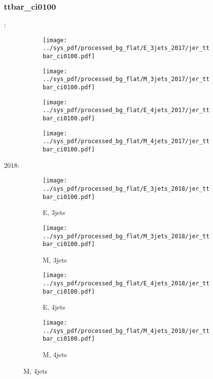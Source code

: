 \documentclass{beamer}
\begin{document}
\begin{frame}
\frametitle{ttbar_ci0100}
\fontsize{5}{1}:
\begin{figure}
\centering
\begin{subfigure}[b]{0.24\textwidth}
\texttt{[image: ../sys\_pdf/processed\_bg\_flat/E\_3jets\_2017/jer\_ttbar\_ci0100.pdf]}
\end{subfigure}
\begin{subfigure}[b]{0.24\textwidth}
\texttt{[image: ../sys\_pdf/processed\_bg\_flat/M\_3jets\_2017/jer\_ttbar\_ci0100.pdf]}
\end{subfigure}
\begin{subfigure}[b]{0.24\textwidth}
\texttt{[image: ../sys\_pdf/processed\_bg\_flat/E\_4jets\_2017/jer\_ttbar\_ci0100.pdf]}
\end{subfigure}
\begin{subfigure}[b]{0.24\textwidth}
\texttt{[image: ../sys\_pdf/processed\_bg\_flat/M\_4jets\_2017/jer\_ttbar\_ci0100.pdf]}
\end{subfigure}
\end{figure}
2018:
\begin{figure}
\centering
\begin{subfigure}[b]{0.24\textwidth}
\texttt{[image: ../sys\_pdf/processed\_bg\_flat/E\_3jets\_2018/jer\_ttbar\_ci0100.pdf]}
\captionsetup{font=tiny}
\caption{E, 3jets}
\end{subfigure}
\begin{subfigure}[b]{0.24\textwidth}
\texttt{[image: ../sys\_pdf/processed\_bg\_flat/M\_3jets\_2018/jer\_ttbar\_ci0100.pdf]}
\captionsetup{font=tiny}
\caption{M, 3jets}
\end{subfigure}
\begin{subfigure}[b]{0.24\textwidth}
\texttt{[image: ../sys\_pdf/processed\_bg\_flat/E\_4jets\_2018/jer\_ttbar\_ci0100.pdf]}
\captionsetup{font=tiny}
\caption{E, 4jets}
\end{subfigure}
\begin{subfigure}[b]{0.24\textwidth}
\texttt{[image: ../sys\_pdf/processed\_bg\_flat/M\_4jets\_2018/jer\_ttbar\_ci0100.pdf]}
\captionsetup{font=tiny}
\caption{M, 4jets}
\end{subfigure}
\end{figure}
\end{frame}
\end{document}

